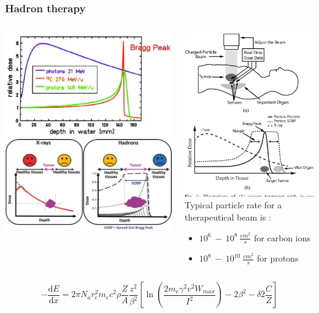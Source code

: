 \documentclass[aspectratio=169]{beamer}
\begin{document}
	\begin{frame}
	\frametitle{Hadron therapy}
	\begin{columns}
		\begin{center}
			\includegraphics[width=0.75 \textwidth]{IMG/Bragg_Peak.PNG}
			\includegraphics[width=0.65 \textwidth]{IMG/Bragg_Peak2.PNG}
		\end{center}
		\begin{center}
			\includegraphics[width=0.3 \textwidth]{IMG/HadroTherapy.PNG}
			\newline
			Typical particle rate for a therapeutical beam is :
			\begin{itemize}
				\item $10^6 \:- \: 10^8 \: \frac{cm^2}{s}$ for carbon ions
				\item $10^8 \:- \: 10^{10} \: \frac{cm^2}{s}$ for protons
			\end{itemize}
		\end{center}
	\end{columns}
	\begin{center}
		\begin{equation}
			-\dfrac{\mathrm dE}{\mathrm dx} = 2 \pi N_{a} r_{e}^{2} m_{e} c^{2} \rho \dfrac{Z}{A}  \dfrac{z^{2}}{\beta^{2}}\left[\ln\left(\dfrac{2m_{e} \gamma ^{2} v^{2} W_{max}}{I^{2}}\right) - 2\beta^{2} - \delta 2\frac{C}{Z}\right]
		\end{equation}
	\end{center}
	
	\end{frame}
\end{document}
